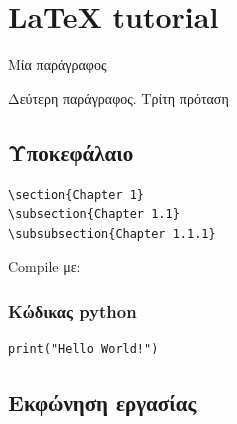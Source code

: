 \label{Chapter1}

\section{LaTeX tutorial}

Μία παράγραφος \par
Δεύτερη παράγραφος. Τρίτη πρόταση

\subsection{Υποκεφάλαιο}

\begin{verbatim}
\section{Chapter 1}
\subsection{Chapter 1.1}
\subsubsection{Chapter 1.1.1}
\end{verbatim}

Compile με: 

\subsubsection{Κώδικας python}
\begin{verbatim}
print("Hello World!")
\end{verbatim}

\subsection{Εκφώνηση εργασίας}

